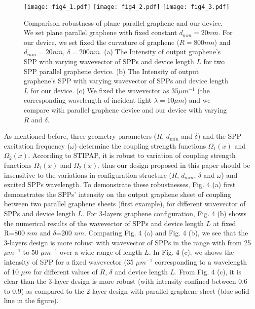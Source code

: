 \documentclass[preprint,12pt,numbers,sort&compress]{elsarticle}
\begin{document}
\begin{figure}[hbtp]
\centering
\texttt{[image: fig4\_1.pdf]}
\texttt{[image: fig4\_2.pdf]}
\texttt{[image: fig4\_3.pdf]}
\caption{Comparison robustness of plane parallel graphene and our device. We set plane parallel graphene with fixed constant $d_{min}=20nm$. For our device, we set fixed the curvature of graphene ($R=800nm$) and $d_{min}=20nm$, $\delta=200nm$. (a) The Intensity of output graphene's SPP with varying wavevector of SPPs and device length $L$ for two SPP parallel graphene device. (b) The Intensity of output graphene's SPP with varying wavevector of SPPs and device length $L$ for our device. (c) We fixed the wavevector as 35$\mu m^{-1}$ (the corresponding wavelength of incident light $\lambda=10 \mu m$) and we compare with parallel graphene device and our device with varying $R$ and $\delta$.}
\end{figure}

As mentioned before, three geometry parameters ($R$, $d_{min}$ and $\delta$) and the SPP excitation frequency ($\omega$) determine the coupling strength functions $\Omega_1(x)$ and $\Omega_2(x)$.
According to STIPAP, it is robust to variation of coupling strength functions $\Omega_1(x)$ and $\Omega_2(x)$, thus our design proposed in this paper should be insensitive to the variations in configuration structure ($R$, $d_{min}$, $\delta$ and $\omega$) and excited SPPs wavelength.
To demonstrate these robustnesses, Fig. 4 (a) first demonstrates the SPPs' intensity on the output graphene sheet of coupling between two parallel graphene sheets (first example), for different wavevector of SPPs and device length $L$.
For 3-layers graphene configuration, Fig. 4 (b) shows the numerical results of the wavevector of SPPs and device length $L$ at fixed R=800 $nm$ and $\delta$=200 $nm$.
Comparing Fig. 4 (a) and Fig. 4 (b), we see that the 3-layers design is more robust with wavevector of SPPs in the range with from 25 $\mu m^{-1}$ to 50 $\mu m^{-1}$ over a wide range of length $L$.
In Fig. 4 (c), we shows the intensity of SPP for a fixed wavevector (35 $\mu m^{-1}$ corresponding to a wavelength of 10 $\mu m$ for different values of $R$, $\delta$ and device length $L$.
From Fig. 4 (c), it is clear than the 3-layer design is more robust (with intensity confined between 0.6 to 0.9) as compared to the 2-layer design with parallel graphene sheet (blue solid line in the figure).
\end{document}
